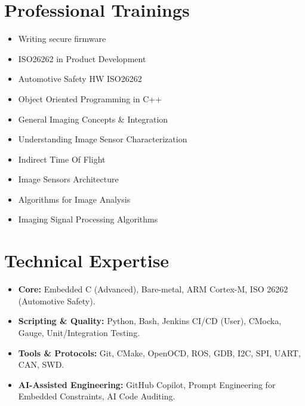 \documentclass[letterpaper,11pt]{article}
\def\vspaceAfterBullets{1pt} %
\def\bulletIndent{15pt} %
\newcommand{\bulletItem}[1]{
  \item\small{
    {#1}
  }
}
\newcommand{\sectionListStart}{\begin{itemize}[leftmargin=0pt, label={}]}
\newcommand{\sectionListEnd}{\end{itemize}}
\newcommand{\outerBulletListStart}{\begin{itemize}[leftmargin=\bulletIndent]}
\newcommand{\outerBulletListEnd}{\end{itemize}\vspace{\vspaceAfterBullets}}
\begin{document}
\section{Professional Trainings}
\outerBulletListStart
\bulletItem{Writing secure firmware}
\bulletItem{ISO26262 in Product Development}
\bulletItem{Automotive Safety HW ISO26262}
\bulletItem{Object Oriented Programming in C++}
\bulletItem{General Imaging Concepts \& Integration}
\bulletItem{Understanding Image Sensor Characterization}
\bulletItem{Indirect Time Of Flight}
\bulletItem{Image Sensors Architecture}
\bulletItem{Algorithms for Image Analysis}
\bulletItem{Imaging Signal Processing Algorithms}
\outerBulletListEnd
\vspace{0.25em} %

\section{Technical Expertise}
\sectionListStart
\bulletItem{\textbf{Core:} Embedded C (Advanced), Bare-metal, ARM Cortex-M, ISO 26262 (Automotive Safety).}
\bulletItem{\textbf{Scripting \& Quality:} Python, Bash, Jenkins CI/CD (User), CMocka, Gauge, Unit/Integration Testing.}
\bulletItem{\textbf{Tools \& Protocols:} Git, CMake, OpenOCD, ROS, GDB, I2C, SPI, UART, CAN, SWD.}
\bulletItem{\textbf{AI-Assisted Engineering:} GitHub Copilot, Prompt Engineering for Embedded Constraints, AI Code Auditing.}
\sectionListEnd
\vspace{1em} %

\end{document}
